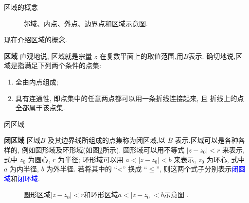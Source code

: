 \documentclass[fontset=windows, chinese, 10pt]{beamer}
\newcommand{\blue}[1]{\textcolor{blue}{#1}}
\begin{document}
  \begin{frame}{区域的概念}

    \begin{figure}[htb]
      \centering
      \scalebox{0.6}{
        }
      \caption{邻域、内点、外点、边界点和区域示意图.}
      \label{fig:region}
  \end{figure}
  
  
  
  现在介绍区域的概念. 
  
  \textbf{区域} \quad 直观地说,  区域就是宗量 $z$ 在复数平面上的取值范围,用$B$表示. 
  确切地说,区域是指满足下列两个条件的点集:
      \begin{enumerate}
          \item 全由内点组成;
          \item 具有连通性, 即点集中的任意两点都可以用一条折线连接起来, 且 折线上的点全都属于该点集.
      \end{enumerate}
  \end{frame}
  

  \begin{frame}{闭区域}
    
    \textbf{闭区域} \quad 区域$B$ 及其边界线所组成的点集称为闭区域,以 $\bar{B}$ 表示.区域可以是各种各样的, 例如圆形域及环形域(如图\ref{fig:annular}所示). 
    圆形域可以用不等式 $\left|z-z_0\right|<r$ 来表示, 式中 $z_0$ 为圆心, $r$ 为半径; 
    环形域可以用 $a<\left|z-z_0\right|<b$ 来表示, $z_0$ 为环心, 式中 $a$ 为内半径, $b$ 为外半径.
     若将其中的 “<” 换成 $“ \leqslant ”$, 则这两个式子分别表示\blue{闭圆域}和\blue{闭环域}.
    
    \begin{figure}
        \centering
    
        \scalebox{0.6}{
        
        }
        \caption{ 圆形区域$\left|z-z_0\right|<r$和环形区域$a<\left|z-z_0\right|<b$示意图 .}
        \label{fig:annular}
    \end{figure}
  \end{frame}
\end{document}
